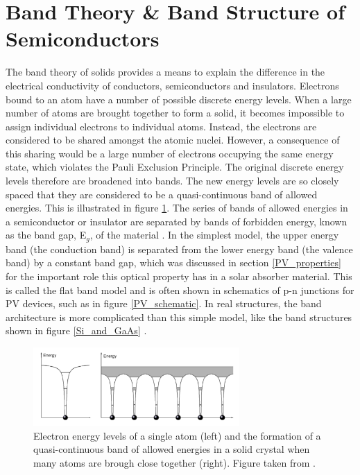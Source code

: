 \section{Band Theory \& Band Structure of Semiconductors}\label{band_theory}
The band theory of solids provides a means to explain the difference in the electrical conductivity of conductors, semiconductors and insulators. Electrons bound to an atom have a number of possible discrete energy levels. When a large number of atoms are brought together to form a solid, it becomes impossible to assign individual electrons to individual atoms. Instead, the electrons are considered to be shared amongst the atomic nuclei. However, a consequence of this sharing would be a large number of electrons occupying the same energy state, which violates the Pauli Exclusion Principle. The original discrete energy levels therefore are broadened into bands. The new energy levels are so closely spaced that they are considered to be a quasi-continuous band of allowed energies. This is illustrated in figure \ref{band_Elevels}. The series of bands of allowed energies in a semiconductor or insulator are separated by bands of forbidden energy, known as the band gap, E$_g$, of the material \cite{dielectric1}. In the simplest model, the upper energy band (the conduction band) is separated from the lower energy band (the valence band) by a constant band gap, which was discussed in section \ref{PV_properties} for the important role this optical property has in a solar absorber material. This is called the flat band model and is often shown in schematics of p-n junctions for PV devices, such as in figure \ref{PV_schematic}. In real structures, the band architecture is more complicated than this simple model, like the band structures shown in figure \ref{Si_and_GaAs} \cite{Tilley}.

\begin{figure}[h!]
  \centering
    \includegraphics[width=0.7\textwidth]{figures/band_Elevels.png}
    \caption{Electron energy levels of a single atom (left) and the formation of a quasi-continuous band of allowed energies in a solid crystal when many atoms are brough close together (right). Figure taken from .}
  \label{band_Elevels}
\end{figure}

